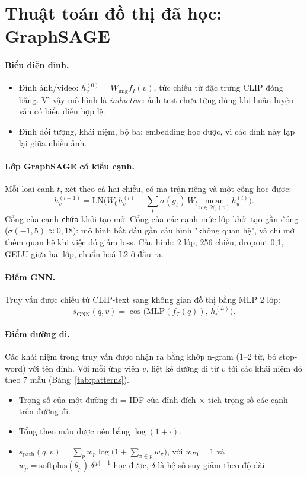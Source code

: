\documentclass[11pt,a4paper]{article}
\begin{document}
\section{Thuật toán đồ thị đã học: GraphSAGE}\label{sec:gnn}

\paragraph{Biểu diễn đỉnh.}
\begin{itemize}
  \item Đỉnh ảnh/video: \(h^{(0)}_v=W_{\text{img}}f_I(v)\), tức chiếu từ đặc trưng CLIP đóng băng. Vì vậy mô hình là \emph{inductive}: ảnh test chưa từng dùng khi huấn luyện vẫn có biểu diễn hợp lệ.
  \item Đỉnh đối tượng, khái niệm, bộ ba: embedding học được, vì các đỉnh này lặp lại giữa nhiều ảnh.
\end{itemize}

\paragraph{Lớp GraphSAGE có kiểu cạnh.} Mỗi loại cạnh \(t\), xét theo cả hai chiều, có ma trận riêng và một cổng học được:
\[
h^{(l+1)}_v=\mathrm{LN}\Big(W_0h^{(l)}_v+\sum_{t}\sigma(g_t)\,W_t\,\underset{u\in\mathcal N_t(v)}{\mathrm{mean}}\,h^{(l)}_u\Big).
\]
Cổng của cạnh \texttt{chứa} khởi tạo mở. Cổng của các cạnh mức lớp khởi tạo gần đóng (\(\sigma(-1{,}5)\approx 0{,}18\)): mô hình bắt đầu gần cấu hình "không quan hệ", và chỉ mở thêm quan hệ khi việc đó giảm loss. Cấu hình: 2 lớp, 256 chiều, dropout 0,1, GELU giữa hai lớp, chuẩn hoá L2 ở đầu ra.

\paragraph{Điểm GNN.} Truy vấn được chiếu từ CLIP-text sang không gian đồ thị bằng MLP 2 lớp:
\[
s_{\text{GNN}}(q,v)=\cos\big(\mathrm{MLP}(f_T(q)),\,h^{(L)}_v\big).
\]

\paragraph{Điểm đường đi.} Các khái niệm trong truy vấn được nhận ra bằng khớp n-gram (1–2 từ, bỏ stop-word) với tên đỉnh. Với mỗi ứng viên \(v\), liệt kê đường đi từ \(v\) tới các khái niệm đó theo 7 mẫu (Bảng~\ref{tab:patterns}).
\begin{itemize}
  \item Trọng số của một đường đi = IDF của đỉnh đích × tích trọng số các cạnh trên đường đi.
  \item Tổng theo mẫu được nén bằng \(\log(1+\cdot)\).
  \item \(s_{\text{path}}(q,v)=\sum_p w_p\log\big(1+\sum_{\pi\in p}w_\pi\big)\), với \(w_{P0}=1\) và \(w_p=\mathrm{softplus}(\theta_p)\,\delta^{|p|-1}\) học được, \(\delta\) là hệ số suy giảm theo độ dài.
\end{itemize}
\end{document}
